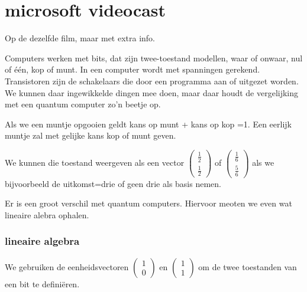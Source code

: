 \documentclass[../../main.tex]{subfiles}
\begin{document}
\onlyinsubfile{\setcounter{chapter}{8}}
\notinsubfile{}
\chapter{microsoft videocast}


Op de  dezelfde film, maar met extra info.

Computers werken met bits, dat zijn twee-toestand modellen, waar of onwaar, nul of \'e\'en, kop of munt. In een computer wordt met spanningen gerekend. Transistoren zijn de schakelaars die door een programma aan of uitgezet worden. We kunnen daar ingewikkelde dingen mee doen, maar daar houdt de vergelijking met een quantum computer zo'n beetje op.

\begin{center}  %
\leavevmode
{}
\end{center}

Als we een muntje opgooien geldt kans op munt + kans op kop =1.
Een eerlijk muntje zal met gelijke kans kop of munt geven.

We kunnen die toestand weergeven als een vector 
$\begin{pmatrix}
\tfrac{1}{2}\\
\tfrac{1}{2}
\end{pmatrix}$
of 
$\begin{pmatrix}
\tfrac{1}{6}\\
\tfrac{5}{6}
\end{pmatrix}$
als we bijvoorbeeld de uitkomst=drie of geen drie als basis nemen.

Er is een groot verschil met quantum computers. Hiervoor meoten we even wat lineaire alebra ophalen.

\subsection{lineaire algebra}
We gebruiken de eenheidsvectoren $\begin{pmatrix}
1\\
0
\end{pmatrix}$
 en $\begin{pmatrix}
1\\
1
\end{pmatrix}$
om de twee toestanden van een bit te defini\"eren.
\end{document}
